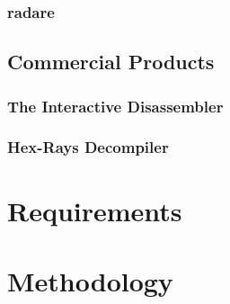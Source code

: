 \documentclass[12pt, a4paper]{article}
\begin{document}
\cite{boomerang}


\subsubsection{radare}

\cite{radare}


\subsection{Commercial Products}



\subsubsection{The Interactive Disassembler}


\subsubsection{Hex-Rays Decompiler}



\section{Requirements}


\section{Methodology}

\end{document}
